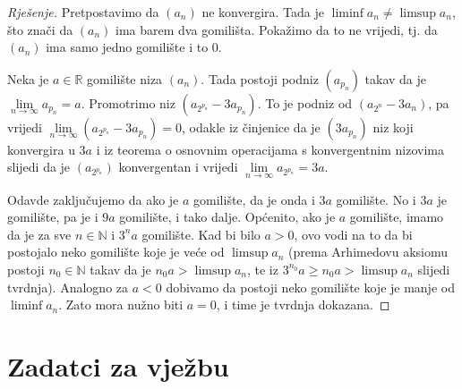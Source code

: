 \begin{proof}[Rješenje]
Pretpostavimo da $(a_n)$ ne konvergira. Tada je $\liminf{a_n}\neq \limsup{a_n}$, što znači da $(a_n)$ ima barem dva gomilišta. Pokažimo da to ne vrijedi, tj. da $(a_n)$ ima samo jedno gomilište i to $0$.

Neka je $a\in \mathbb{R}$ gomilište niza $(a_n)$. Tada postoji podniz $(a_{p_n})$ takav da je $\lim\limits_{n\to \infty}{a_{p_n}}=a$. Promotrimo niz $(a_{2^{p_n}}-3a_{p_n})$. To je podniz od $(a_{2^n}-3a_n)$, pa vrijedi $\lim\limits_{n\to \infty}{(a_{2^{p_n}}-3a_{p_n})}=0$, odakle iz činjenice da je $(3a_{p_n})$ niz koji konvergira u $3a$ i iz teorema o osnovnim operacijama s konvergentnim nizovima slijedi da je $(a_{2^{p_n}})$ konvergentan i vrijedi $\lim\limits_{n\to \infty}{a_{2^{p_n}}}=3a$.

Odavde zaključujemo da ako je $a$ gomilište, da je onda i $3a$ gomilište. No i $3a$ je gomilište, pa je i $9a$ gomilište, i tako dalje. Općenito, ako je $a$ gomilište, imamo da je za sve $n\in \mathbb{N}$ i $3^na$ gomilište. Kad bi bilo $a>0$, ovo vodi na to da bi postojalo neko gomilište koje je veće od $\limsup{a_n}$ (prema Arhimedovu aksiomu postoji $n_0\in \mathbb{N}$ takav da je $n_0a>\limsup{a_n}$, te iz $3^{n_0}a\geq n_0a>\limsup{a_n}$ slijedi tvrdnja). Analogno za $a<0$ dobivamo da postoji neko gomilište koje je manje od $\liminf{a_n}$. Zato mora nužno biti $a=0$, i time je tvrdnja dokazana.
\end{proof}
\newpage
\section*{Zadatci za vježbu}
